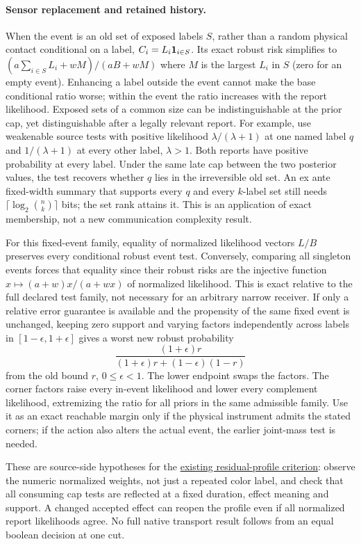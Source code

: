 \documentclass{article}
\begin{document}
\paragraph{Sensor replacement and retained history.}
When the event is an old set of exposed labels $S$, rather than a random physical contact conditional on a label, $C_i=L_i{\bf1}_{i\in S}$. Its exact robust risk simplifies to $(a\sum_{i\in S}L_i+w M)/(aB+w M)$ where $M$ is the largest $L_i$ in $S$ (zero for an empty event). Enhancing a label outside the event cannot make the base conditional ratio worse; within the event the ratio increases with the report likelihood. Exposed sets of a common size can be indistinguishable at the prior cap, yet distinguishable after a legally relevant report. For example, use weakenable source tests with positive likelihood $\lambda/(\lambda+1)$ at one named label $q$ and $1/(\lambda+1)$ at every other label, $\lambda>1$. Both reports have positive probability at every label. Under the same late cap between the two posterior values, the test recovers whether $q$ lies in the irreversible old set. An ex ante fixed-width summary that supports every $q$ and every $k$-label set still needs $\lceil\log_2{n\choose k}\rceil$ bits; the set rank attains it. This is an application of exact membership, not a new communication complexity result.

For this fixed-event family, equality of normalized likelihood vectors $L/B$ preserves every conditional robust event test. Conversely, comparing all singleton events forces that equality since their robust risks are the injective function $x\mapsto(a+w)x/(a+wx)$ of normalized likelihood. This is exact relative to the full declared test family, not necessary for an arbitrary narrow receiver. If only a relative error guarantee is available and the propensity of the same fixed event is unchanged, keeping zero support and varying factors independently across labels in $[1-\epsilon,1+\epsilon]$ gives a worst new robust probability
\[
  \frac{(1+\epsilon)r}{(1+\epsilon)r+(1-\epsilon)(1-r)}
\]
from the old bound $r$, $0\le\epsilon<1$. The lower endpoint swaps the factors. The corner factors raise every in-event likelihood and lower every complement likelihood, extremizing the ratio for all priors in the same admissible family. Use it as an exact reachable margin only if the physical instrument admits the stated corners; if the action also alters the actual event, the earlier joint-mass test is needed.

These are source-side hypotheses for the \href{https://github.com/eternal-november/eos-research-programmes/blob/main/projects/contextual-composition/feedback-and-concurrency/observable-covers/Residual_Profiles_and_Admission_Reflection.tex}{existing residual-profile criterion}: observe the numeric normalized weights, not just a repeated color label, and check that all consuming cap tests are reflected at a fixed duration, effect meaning and support. A changed accepted effect can reopen the profile even if all normalized report likelihoods agree. No full native transport result follows from an equal boolean decision at one cut.
\end{document}
